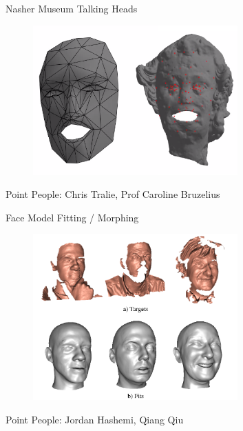 \documentclass{beamer}
\begin{document}
\begin{frame}{Nasher Museum Talking Heads}
\begin{figure}[t]
	\centering
    \includegraphics[width=0.7\textwidth]{FinalProjects/Nasher.png}
\end{figure}

Point People: Chris Tralie, Prof Caroline Bruzelius

\end{frame}

\begin{frame}{Face Model Fitting / Morphing}
\begin{figure}[t]
	\centering
    \includegraphics[width=0.7\textwidth]{FinalProjects/3DFaceFitting.png}
\end{figure}

Point People: Jordan Hashemi, Qiang Qiu

\end{frame}
\end{document}
